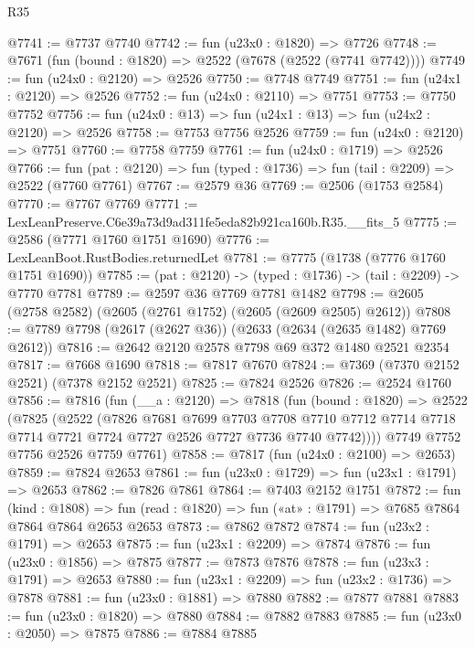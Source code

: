 \begin{lexlean}{R35}
\begin{coremodule}
@7741 := @7737 @7740
@7742 := fun (u23x0 : @1820) => @7726
@7748 := @7671 (fun (bound : @1820) => @2522 (@7678 (@2522 (@7741 @7742))))
@7749 := fun (u24x0 : @2120) => @2526
@7750 := @7748 @7749
@7751 := fun (u24x1 : @2120) => @2526
@7752 := fun (u24x0 : @2110) => @7751
@7753 := @7750 @7752
@7756 := fun (u24x0 : @13) => fun (u24x1 : @13) => fun (u24x2 : @2120) => @2526
@7758 := @7753 @7756 @2526
@7759 := fun (u24x0 : @2120) => @7751
@7760 := @7758 @7759
@7761 := fun (u24x0 : @1719) => @2526
@7766 := fun (pat : @2120) => fun (typed : @1736) => fun (tail : @2209) => @2522 (@7760 @7761)
@7767 := @2579 @36
@7769 := @2506 (@1753 @2584)
@7770 := @7767 @7769
@7771 := LexLeanPreserve.C6e39a73d9ad311fe5eda82b921ca160b.R35.__fits_5
@7775 := @2586 (@7771 @1760 @1751 @1690)
@7776 := LexLeanBoot.RustBodies.returnedLet
@7781 := @7775 (@1738 (@7776 @1760 @1751 @1690))
@7785 := (pat : @2120) -> (typed : @1736) -> (tail : @2209) -> @7770 @7781
@7789 := @2597 @36 @7769 @7781 @1482
@7798 := @2605 (@2758 @2582) (@2605 (@2761 @1752) (@2605 (@2609 @2505) @2612))
@7808 := @7789 @7798 (@2617 (@2627 @36)) (@2633 (@2634 (@2635 @1482) @7769 @2612))
@7816 := @2642 @2120 @2578 @7798 @69 @372 @1480 @2521 @2354
@7817 := @7668 @1690
@7818 := @7817 @7670
@7824 := @7369 (@7370 @2152 @2521) (@7378 @2152 @2521)
@7825 := @7824 @2526
@7826 := @2524 @1760
@7856 := @7816
    (fun (__a : @2120) =>
    @7818
      (fun (bound : @1820) =>
      @2522
        (@7825
          (@2522
            (@7826
              @7681
              @7699
              @7703
              @7708
              @7710
              @7712
              @7714
              @7718
              @7714
              @7721
              @7724
              @7727
              @2526
              @7727
              @7736
              @7740
              @7742))))
      @7749
      @7752
      @7756
      @2526
      @7759
      @7761)
@7858 := @7817 (fun (u24x0 : @2100) => @2653)
@7859 := @7824 @2653
@7861 := fun (u23x0 : @1729) => fun (u23x1 : @1791) => @2653
@7862 := @7826 @7861
@7864 := @7403 @2152 @1751
@7872 := fun (kind : @1808) =>
  fun (read : @1820) => fun («at» : @1791) => @7685 @7864 @7864 @7864 @2653 @2653
@7873 := @7862 @7872
@7874 := fun (u23x2 : @1791) => @2653
@7875 := fun (u23x1 : @2209) => @7874
@7876 := fun (u23x0 : @1856) => @7875
@7877 := @7873 @7876
@7878 := fun (u23x3 : @1791) => @2653
@7880 := fun (u23x1 : @2209) => fun (u23x2 : @1736) => @7878
@7881 := fun (u23x0 : @1881) => @7880
@7882 := @7877 @7881
@7883 := fun (u23x0 : @1820) => @7880
@7884 := @7882 @7883
@7885 := fun (u23x0 : @2050) => @7875
@7886 := @7884 @7885

\end{coremodule}
\end{lexlean}
